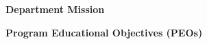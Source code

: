 \vspace{0.5cm} 
\begin{center}
	\textcolor{midnight}{\Large \textbf{Department Mission}}\\
	\begin{tcolorbox}[colback=golden!5!white,colframe=golden!75!black]
				\itshape \DepartmentMission
	\end{tcolorbox}
\end{center}

\vspace{0.5cm} 

\begin{center}
	\textcolor{midnight}{\Large \textbf{Program Educational Objectives (PEOs)}}\\
	\begin{tcolorbox}[colback=green!5!white,colframe=green!75!black]
		\itshape \DepartmentPEOs 
	\end{tcolorbox}
\end{center}


\newpage

